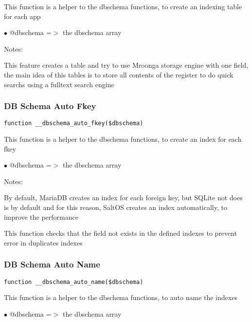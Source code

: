 \documentclass[a4paper]{article}
\begin{document}
This function is a helper to the dbschema functions, to create an indexing table for each app

\begin{compactitem}
\item[\color{myblue}$\bullet$] @dbschema =$>$ the dbschema array
\end{compactitem}

Notes:

This feature creates a table and try to use Mroonga storage engine with one field, the main
idea of this tables is to store all contents of the register to do quick searchs using a
fulltext search engine

\hypertarget{toc422}{}
\subsubsection{DB Schema Auto Fkey}

\begin{lstlisting}
function __dbschema_auto_fkey($dbschema)
\end{lstlisting}

This function is a helper to the dbschema functions, to create an index for each fkey

\begin{compactitem}
\item[\color{myblue}$\bullet$] @dbschema =$>$ the dbschema array
\end{compactitem}

Notes:

By default, MariaDB creates an index for each foreign key, but SQLite not does is by default
and for this reason, SaltOS creates an index automatically, to improve the performance

This function checks that the field not exists in the defined indexes to prevent error in duplicates
indexes

\hypertarget{toc423}{}
\subsubsection{DB Schema Auto Name}

\begin{lstlisting}
function __dbschema_auto_name($dbschema)
\end{lstlisting}

This function is a helper to the dbschema functions, to auto name the indexes

\begin{compactitem}
\item[\color{myblue}$\bullet$] @dbschema =$>$ the dbschema array
\end{compactitem}
\end{document}
